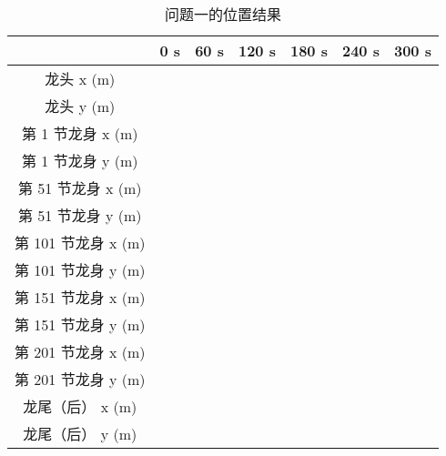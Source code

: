 \documentclass[a4paper]{article}
\begin{document}
		
		\begin{table}[H] %
			\captionsetup{skip=4pt} %
			\caption{问题一的位置结果}
			\centering
			\setlength{\arrayrulewidth}{0.5pt} %
			\begin{tabular}{|c|c|c|c|c|c|c|} %
				\hline
				& 0 s & 60 s & 120 s & 180 s & 240 s & 300 s \\ \hline
				龙头 x (m)      &     &      &       &       &       &       \\ \hline
				龙头 y (m)      &     &      &       &       &       &       \\ \hline
				第 1 节龙身 x (m) &     &      &       &       &       &       \\ \hline
				第 1 节龙身 y (m) &     &      &       &       &       &       \\ \hline
				第 51 节龙身 x (m) &     &      &       &       &       &       \\ \hline
				第 51 节龙身 y (m) &     &      &       &       &       &       \\ \hline
				第 101 节龙身 x (m) &     &      &       &       &       &       \\ \hline
				第 101 节龙身 y (m) &     &      &       &       &       &       \\ \hline
				第 151 节龙身 x (m) &     &      &       &       &       &       \\ \hline
				第 151 节龙身 y (m) &     &      &       &       &       &       \\ \hline
				第 201 节龙身 x (m) &     &      &       &       &       &       \\ \hline
				第 201 节龙身 y (m) &     &      &       &       &       &       \\ \hline
				龙尾（后） x (m) &     &      &       &       &       &       \\ \hline
				龙尾（后） y (m) &     &      &       &       &       &       \\ \hline
			\end{tabular}
		\end{table}
		
\end{document}
